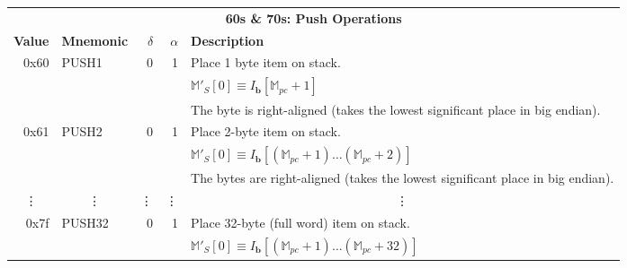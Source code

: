 \documentclass[9pt,oneside]{amsart}
\begin{document}
\begin{tabular*}{\columnwidth}[h]{rlrrl}
\toprule
\multicolumn{5}{c}{\textbf{60s \& 70s: Push Operations}} \vspace{5pt} \\
\textbf{Value} & \textbf{Mnemonic} & $\delta$ & $\alpha$ & \textbf{Description} \vspace{5pt} \\
0x60 & {\small PUSH1} & 0 & 1 & Place 1 byte item on stack. \\
&&&& $\mathbb{M}'_S[0] \equiv I_\mathbf{b}[\mathbb{M}_{pc} + 1]$ \\
&&&& The byte is right-aligned (takes the lowest significant place in big endian). \\
\midrule
0x61 & {\small PUSH2} & 0 & 1 & Place 2-byte item on stack. \\
&&&& $\mathbb{M}'_S[0] \equiv I_\mathbf{b}[(\mathbb{M}_{pc} + 1) \dots (\mathbb{M}_{pc} + 2) ]$ \\
&&&& The bytes are right-aligned (takes the lowest significant place in big endian). \\
\midrule
\multicolumn{1}{c}{\vdots} & \multicolumn{1}{c}{\vdots} & \vdots & \vdots & \multicolumn{1}{c}{\vdots} \\
\midrule
0x7f & {\small PUSH32} & 0 & 1 & Place 32-byte (full word) item on stack. \\
&&&& $\mathbb{M}'_S[0] \equiv I_\mathbf{b}[(\mathbb{M}_{pc} + 1) \dots (\mathbb{M}_{pc} + 32) ]$ \\
\bottomrule
\end{tabular*}
\end{document}
